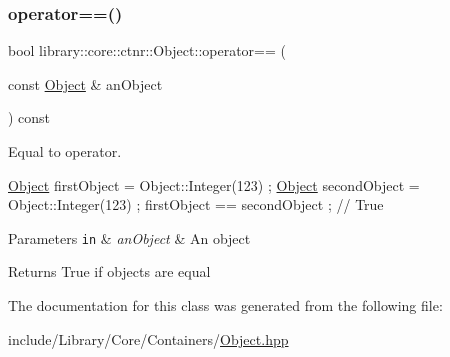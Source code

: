\subsubsection{\texorpdfstring{operator==()}{operator==()}}
{\footnotesize\ttfamily bool library\+::core\+::ctnr\+::\+Object\+::operator== (\begin{DoxyParamCaption}\item[{const \hyperlink{classlibrary_1_1core_1_1ctnr_1_1_object}{Object} \&}]{an\+Object }\end{DoxyParamCaption}) const}



Equal to operator. 


\begin{DoxyCode}
\hyperlink{classlibrary_1_1core_1_1ctnr_1_1_object_a51bb72dec3a1b2738e0ad92b977b8d8d}{Object} firstObject = Object::Integer(123) ;
\hyperlink{classlibrary_1_1core_1_1ctnr_1_1_object_a51bb72dec3a1b2738e0ad92b977b8d8d}{Object} secondObject = Object::Integer(123) ;
firstObject == secondObject ; \textcolor{comment}{// True}
\end{DoxyCode}



\begin{DoxyParams}[1]{Parameters}
\mbox{\tt in}  & {\em an\+Object} & An object \\
\hline
\end{DoxyParams}
\begin{DoxyReturn}{Returns}
True if objects are equal 
\end{DoxyReturn}


The documentation for this class was generated from the following file\+:\begin{DoxyCompactItemize}
\item 
include/\+Library/\+Core/\+Containers/\hyperlink{_object_8hpp}{Object.\+hpp}\end{DoxyCompactItemize}
